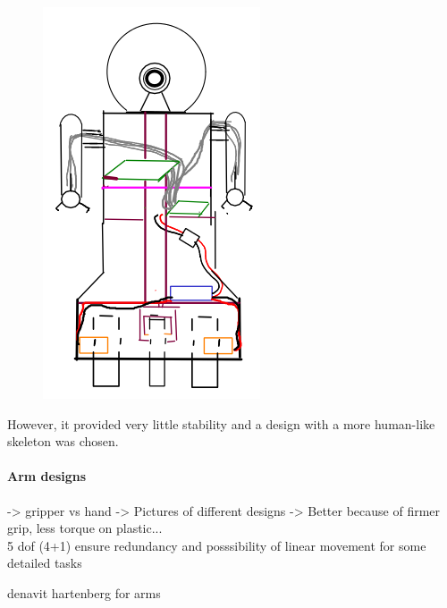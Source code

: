 	\begin{figure}[H]
			\centering
			\includegraphics[scale=0.4]{images/Diagrams/exoskeleton}
			\caption{}
			\label{exoskeleton}
	\end{figure}
	\bigskip

However, it provided very little stability and a design with a more human-like skeleton was chosen.\\


\paragraph{Arm designs}
-> gripper vs hand
 -> Pictures of different designs -> Better because of firmer grip, less torque on plastic... 
\\	






5 dof (4+1) ensure redundancy and posssibility of linear movement for some detailed tasks

denavit hartenberg for arms

